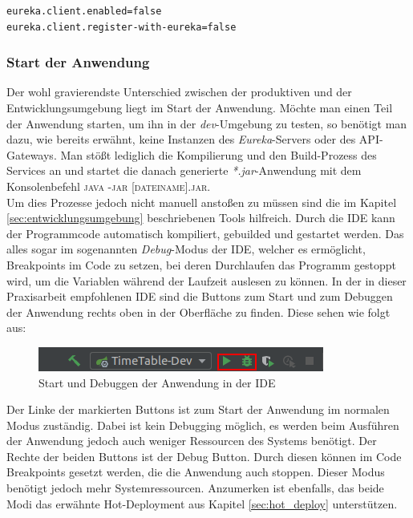 \newpage
\begin{lstlisting}[caption={Discovery und Gateway Deaktivierung}]
eureka.client.enabled=false
eureka.client.register-with-eureka=false
\end{lstlisting}


\subsubsection{Start der Anwendung}

Der wohl gravierendste Unterschied zwischen der produktiven und der Entwicklungsumgebung liegt im Start der Anwendung. Möchte man einen Teil der Anwendung starten, um ihn in der \textit{dev}-Umgebung zu testen, so benötigt man dazu, wie bereits erwähnt, keine Instanzen des \textit{Eureka}-Servers oder des \ac{API}-Gateways. Man stößt lediglich die Kompilierung und den Build-Prozess des Services an und startet die danach generierte \textit{*.jar}-Anwendung mit dem Konsolenbefehl \textsc{java -jar [dateiname].jar}.\\
\linebreak
Um dies Prozesse jedoch nicht manuell anstoßen zu müssen sind die im Kapitel \ref{sec:entwicklungsumgebung} beschriebenen Tools hilfreich. Durch die \ac{IDE} kann der Programmcode automatisch kompiliert, gebuilded und gestartet werden. Das alles sogar im sogenannten \textit{Debug}-Modus der \ac{IDE}, welcher es ermöglicht, Breakpoints im Code zu setzen, bei deren Durchlaufen das Programm gestoppt wird, um die Variablen während der Laufzeit auslesen zu können. In der in dieser Praxisarbeit empfohlenen \ac{IDE} sind die Buttons zum Start und zum Debuggen der Anwendung rechts oben in der Oberfläche zu finden. Diese sehen wie folgt aus:

\begin{figure}[H]
\centering
\includegraphics[width=\pictureWidth cm]{Bilder/Kapitel_5/ide_start_prog.png}
\caption{Start und Debuggen der Anwendung in der \ac{IDE}\label{fig:ide_start_prog}}
\end{figure}

Der Linke der markierten Buttons ist zum Start der Anwendung im normalen Modus zuständig. Dabei ist kein Debugging möglich, es werden beim Ausführen der Anwendung jedoch auch weniger Ressourcen des Systems benötigt. Der Rechte der beiden Buttons ist der Debug Button. Durch diesen können im Code Breakpoints gesetzt werden, die die Anwendung auch stoppen. Dieser Modus benötigt jedoch mehr Systemressourcen. Anzumerken ist ebenfalls, das beide Modi das erwähnte Hot-Deployment aus Kapitel \ref{sec:hot_deploy} unterstützen. 

